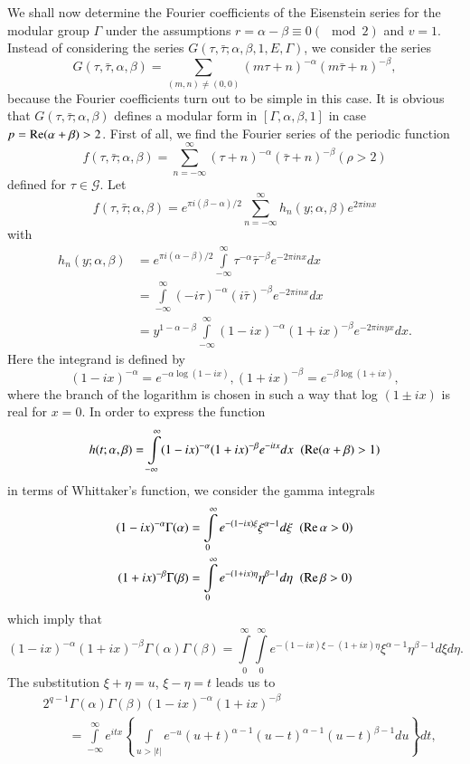 We shall now determine the Fourier coefficients of the Eisenstein
series for the modular group $\Gamma$ under the assumptions
$r=\alpha-\beta \equiv 0(\mod 2)$ and $v=1$. Instead of considering
the series $G(\tau,\bar{\tau};\alpha, \beta, 1, E, \Gamma)$, we
consider the series
$$
G(\tau,\bar{\tau}, \alpha, \beta) = \sum_{(m,n)\neq(0,0)}
(m\tau+n)^{-\alpha} (m\bar{\tau}+n)^{-\beta},
$$
because the Fourier coefficients turn out to be simple in this
case. It is obvious that $G(\tau,\bar{\tau};\alpha,\beta)$ defines a
modular form in $[\Gamma,\alpha,\beta,1]$ in case
$p=\operatorname{Re}(\alpha+\beta)>2$. First of all, we find the Fourier series of
the periodic function
$$
f(\tau,\bar{\tau};\alpha,\beta) = \sum^{\infty}_{n=-\infty}
(\tau+n)^{-\alpha} (\bar{\tau}+n)^{-\beta} (\rho>2)
$$
defined for $\tau\in \mathscr{G}$. Let
$$
f(\tau,\bar{\tau};\alpha,\beta) =e^{\pi i(\beta-\alpha)/2}
\sum^{\infty}_{n=-\infty} h_n(y;\alpha,\beta) e^{2\pi inx}
$$
with \pageoriginale
\begin{align*}
h_n(y;\alpha,\beta) & = e^{\pi i(\alpha-\beta)/2}
\int\limits^{\infty}_{-\infty} \tau^{-\alpha} {\bar{\tau}}^{-\beta}
e^{-2\pi inx}dx\\
& = \int\limits^{\infty}_{-\infty} (-i\tau)^{-\alpha}
(i\bar{\tau})^{-\beta} e^{-2\pi i nx}dx\\
& = y^{1-\alpha-\beta} \int\limits^{\infty}_{-\infty} (1-ix)^{-\alpha}
(1+ix)^{-\beta} e^{-2\pi i n yx}dx.
\end{align*}
Here the integrand is defined by
$$
(1-ix)^{-\alpha} = e^{-\alpha\log(1-ix)}, (1+ix)^{-\beta} =
e^{-\beta\log(1+ix)}, 
$$
where the branch of the logarithm is chosen in such a way that log
$(1\pm ix)$ is real for $x=0$. In order to express the function
$$
h(t;\alpha,\beta) = \int\limits^{\infty}_{-\infty} (1-ix)^{-\alpha}
(1+ix)^{-\beta} e^{-itx} dx \;\; (\operatorname{Re} (\alpha+\beta)>1)
$$
in terms of Whittaker's function, we consider the gamma integrals 
\begin{align*}
(1-ix)^{-\alpha}\Gamma(\alpha) & = \int\limits^{\infty}_0
  e^{-(1-ix)\xi} \xi^{\alpha-1} d\xi \;\; (\operatorname{Re} \alpha >0)\\
(1+ix)^{-\beta} \Gamma(\beta) & = \int\limits^{\infty}_0
  e^{-(1+ix)\eta} \eta^{\beta-1} d\eta \;\; (\operatorname{Re} \beta >0)
\end{align*}
which imply that
$$
(1-ix)^{-\alpha} (1+ix)^{-\beta} \Gamma(\alpha)\Gamma(\beta) = 
\int\limits^{\infty}_{0} \int\limits^{\infty}_{0}
e^{-(1-ix)\xi-(1+ix)\eta} \xi^{\alpha-1} \eta^{\beta-1} d\xi d\eta.
$$
The substitution $\xi+\eta=u$, $\xi-\eta=t$ leads us to 
\begin{align*} 
&2^{q-1} \Gamma(\alpha) \Gamma(\beta) (1-ix)^{-\alpha} (1+ix)^{-\beta}\\
&\qquad = \int\limits^{\infty}_{-\infty} e^{itx} \left\{\int\limits_{u>|t|} e^{-u}
(u+t)^{\alpha-1} (u-t)^{\alpha-1} (u-t)^{\beta-1}du \right\} dt,
\end{align*}
